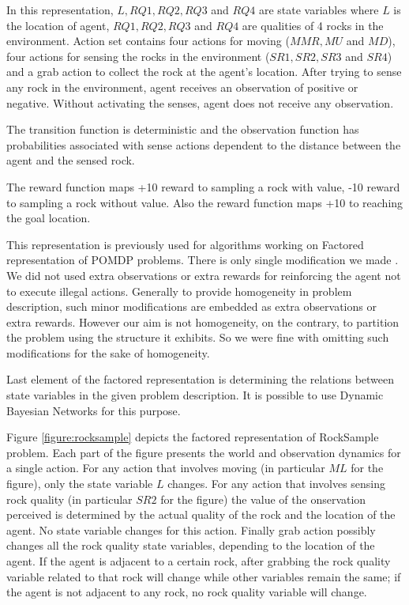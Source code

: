 In this representation, $L, RQ1, RQ2, RQ3$ and $RQ4$ are state variables where $L$ is the location of agent, $RQ1,RQ2,RQ3$ and $RQ4$ are qualities of 4 rocks in the environment. Action set contains four actions for moving ($M MR, MU$ and $MD$), four actions for sensing the rocks in the environment ($SR1, SR2, SR3$ and $SR4$) and a grab action to collect the rock at the agent's location. After trying to sense any rock in the environment, agent receives an observation of positive or negative. Without activating the senses, agent does not receive any observation.

The transition function is deterministic and the observation function has probabilities associated with sense actions dependent to the distance between the agent and the sensed rock.

The reward function maps +10 reward to sampling a rock with value, -10 reward to sampling a rock without value. Also the reward function maps +10 to reaching the goal location.

This representation is previously used for algorithms working on Factored representation of POMDP problems. There is only single modification we made . We did not used extra observations or extra rewards for reinforcing the agent not to execute illegal actions. Generally to provide homogeneity in problem description, such minor modifications are embedded as extra observations or extra rewards. However our aim is not homogeneity, on the contrary, to partition the problem using the structure it exhibits. So we were fine with omitting such modifications for the sake of homogeneity.

Last element of the factored representation is determining the relations between state variables in the given problem description. It is possible to use Dynamic Bayesian Networks for this purpose.

Figure \ref{figure:rocksample} depicts the factored representation of RockSample problem. Each part of the figure presents the world and observation dynamics for a single action. For any action that involves moving (in particular $ML$ for the figure), only the state variable $L$ changes. For any action that involves sensing rock quality (in particular $SR2$ for the figure) the value of the onservation perceived is determined by the actual quality of the rock and the location of the agent. No state variable changes for this action. Finally grab action possibly changes all the rock quality state variables, depending to the location of the agent. If the agent is adjacent to a certain rock, after grabbing the rock quality variable related to that rock will change while other variables remain the same; if the agent is not adjacent to any rock, no rock quality variable will change.

